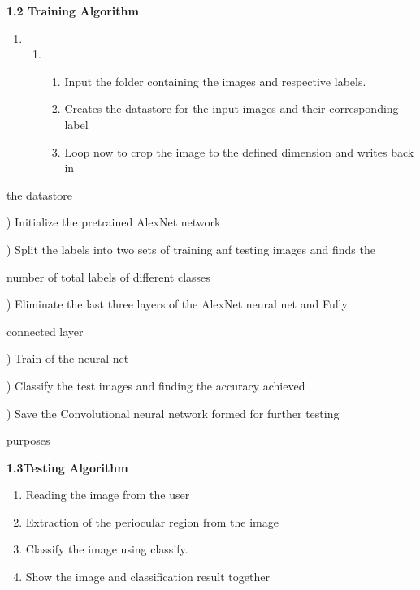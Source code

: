 \documentclass{article} %
\begin{document}
\noindent 

\noindent 

\noindent \textbf{1.2 Training Algorithm}

\begin{enumerate}
\item \begin{enumerate}
\item \begin{enumerate}
\item \textbf{ }Input the folder containing the images and respective labels.

\item  Creates the datastore for the input images and their corresponding label

\item  Loop now to crop the image to the defined dimension and writes back in                 
\end{enumerate}
\end{enumerate}
\end{enumerate}

\noindent the datastore 

)   Initialize the pretrained AlexNet network

)  Split the labels into two sets of training anf testing images and finds the  

\noindent                          number of total labels of different classes

)   Eliminate the last three layers of the AlexNet neural net and Fully 

\noindent                           connected layer  

)   Train of the neural net

)   Classify the test images and finding the accuracy achieved

)   Save the Convolutional neural network formed for further testing  

\noindent                            purposes

\noindent 

\noindent 

\noindent 

\noindent \textbf{}

\noindent \textbf{1.3Testing Algorithm}

\begin{enumerate}
\item \textbf{ }Reading the image from the user

\item  Extraction of the periocular region from the image

\item  Classify the image using classify.

\item  Show the image and classification result together
\end{enumerate}
\end{document}
